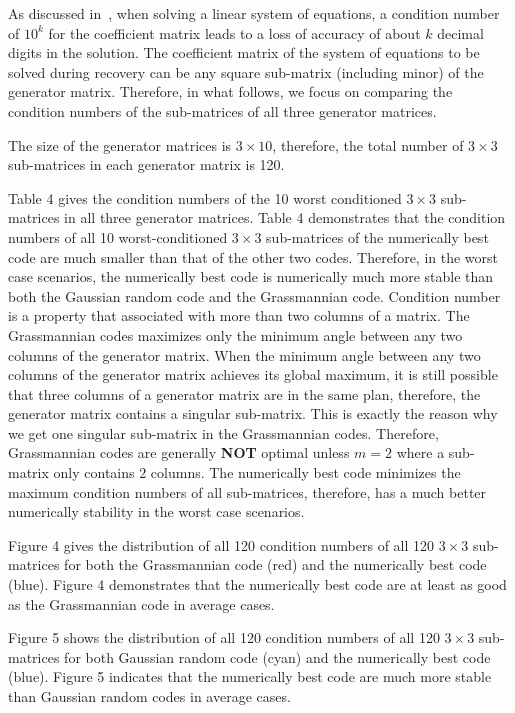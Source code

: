 \documentclass{sig-alternate}
\begin{document}
As discussed in~\cite{golub89:matrix}, when solving a 
linear system of equations, a condition number of $10^k$ for the coefficient matrix
leads to a loss of accuracy of about $k$ decimal digits in the solution.
The coefficient matrix of the system of equations to be solved during recovery
can be any square sub-matrix (including minor) of the generator matrix.
Therefore, in what follows, we focus on comparing the condition numbers 
of the sub-matrices of all three generator matrices.

The size of the generator matrices is $3 \times 10$, therefore, the total number of $3 \times 3$ sub-matrices
in each generator matrix is 120. 






Table 4 gives the condition numbers of the 10 worst conditioned 
$3\times3$ sub-matrices in all three generator matrices.
Table 4 demonstrates that the condition numbers of all 
10 worst-conditioned $3\times3$ sub-matrices
of the numerically best code are much smaller than that of the other two codes.
Therefore, in the  worst case scenarios, the numerically best code is numerically much more stable
than both the Gaussian random code and the Grassmannian code.
Condition number is a property that associated with more than two columns of a matrix.
The Grassmannian codes maximizes only the minimum angle between any two columns of the generator matrix.
When the minimum angle between any two columns of the generator matrix achieves its global maximum,
it is still possible that three columns of a generator matrix are in the same plan, therefore,
the generator matrix contains a singular sub-matrix. This is exactly the reason why we get one singular sub-matrix
in the Grassmannian codes. Therefore, Grassmannian codes are generally {\bf NOT} optimal unless $m=2$ 
where a sub-matrix only contains $2$ columns.
The numerically best code minimizes the maximum condition numbers of all sub-matrices, therefore,
has a much better numerically stability in the worst case scenarios.

 


Figure 4 gives the distribution of all 120 condition numbers of all 120 $3\times3$ sub-matrices 
for both the Grassmannian code (red) and the numerically best code (blue).
Figure 4 demonstrates that the numerically best code are at least as good as the 
Grassmannian code in average cases.

Figure 5 shows the distribution of all 120 condition numbers of all 120 $3\times3$ sub-matrices 
for both Gaussian random code (cyan) and the numerically best code (blue). 
Figure 5 indicates that the numerically best code are much more stable than Gaussian random
codes in average cases.
\end{document}
